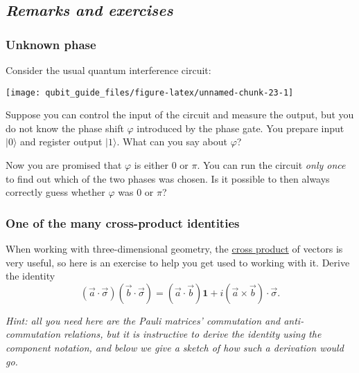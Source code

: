 \documentclass[fleqn]{article}
\begin{document}
\hypertarget{remarks-and-exercises-qubits}{%
\subsection{\texorpdfstring{\emph{Remarks and exercises}}{Remarks and exercises}}\label{remarks-and-exercises-qubits}}

\hypertarget{unknown-phase}{%
\subsubsection{Unknown phase}\label{unknown-phase}}

Consider the usual quantum interference circuit:

\begin{center}\texttt{[image: qubit\_guide\_files/figure-latex/unnamed-chunk-23-1]} \end{center}

Suppose you can control the input of the circuit and measure the output, but you do not know the phase shift \(\varphi\) introduced by the phase gate.
You prepare input \(|0\rangle\) and register output \(|1\rangle\).
What can you say about \(\varphi\)?

Now you are promised that \(\varphi\) is either \(0\) or \(\pi\).
You can run the circuit \emph{only once} to find out which of the two phases was chosen.
Is it possible to then always correctly guess whether \(\varphi\) was \(0\) or \(\pi\)?

\hypertarget{cross-product-identity}{%
\subsubsection{One of the many cross-product identities}\label{cross-product-identity}}

When working with three-dimensional geometry, the \href{https://en.wikipedia.org/wiki/Cross_product}{cross product} of vectors is very useful, so here is an exercise to help you get used to working with it.
Derive the identity
\[
  (\vec{a}\cdot\vec{\sigma})(\vec{b}\cdot\vec{\sigma})
  = (\vec{a}\cdot\vec{b})\mathbf{1}+ i(\vec{a}\times \vec{b})\cdot \vec{\sigma}.
\]

\emph{Hint: all you need here are the Pauli matrices' commutation and anti-commutation relations, but it is instructive to derive the identity using the component notation, and below we give a sketch of how such a derivation would go.}
\end{document}
